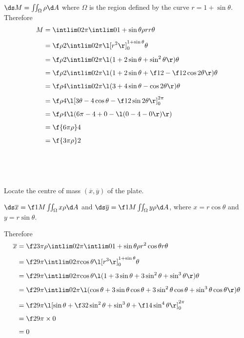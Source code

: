 \documentclass[a4paper]{article}
\begin{document}
$\ds M = \iint_\Omega \rho \d A$ where $\Omega$ is the region defined by the curve $r = 1 + \sin \theta$. Therefore \begin{align*}
M &= \intlim 0{2\pi} {\intlim 0 {1 + \sin \theta} {\rho r} r} \theta\\[1ex]
&= \f\rho2 \intlim 0{2\pi} {\l[ r^2 \r]_0^{1 + \sin \theta}} \theta\\[1ex]
&= \f\rho2 \intlim 0{2\pi} {\l( 1 + 2\sin\theta + \sin^2 \theta \r)} \theta\\[1ex]
&= \f\rho2 \intlim 0{2\pi} {\l( 1 + 2\sin\theta + \f12 - \f12 \cos 2\theta \r)} \theta\\[1ex]
&= \f\rho4 \intlim 0{2\pi} {\l( 3 + 4\sin\theta - \cos 2\theta \r)} \theta\\[1ex]
&= \f\rho4 \l[ 3\theta - 4\cos\theta - \f12 \sin 2\theta \r]_0^{2\pi}\\[1ex]
&= \f\rho4 \l( 6\pi - 4 + 0 - \l( 0 - 4 - 0 \r) \r)\\[1ex]
&= \f{6\pi \rho}4\\[1ex]
&= \f{3\pi \rho}2\\[1ex]
\end{align*}

\subsection{~} %

\begin{questionbody}
Locate the centre of mass $(\overline x, \overline y)$ of the plate.
\end{questionbody}

$\ds \overline x = \f1M \iint_\Omega x \rho \d A$ and $\ds \overline y = \f1M \iint_\Omega y \rho \d A$, where $x = r\cos\theta$ and $y = r\sin\theta$.

Therefore \begin{align*}
\overline x &= \f2{3\pi\rho} \intlim 0{2\pi} {\intlim 0 {1 + \sin \theta} {\rho r^2 \cos \theta} r} \theta \\[1ex]
&= \f2{9\pi} \intlim 0{2\pi} {\cos \theta \l[r^3\r]_0^{1 + \sin\theta}} \theta \\[1ex]
&= \f2{9\pi} \intlim 0{2\pi} {\cos \theta \l( 1 + 3\sin\theta + 3\sin^2 \theta + \sin^3 \theta \r)} \theta \\[1ex]
 &= \f2{9\pi} \intlim 0{2\pi} {\l( \cos\theta + 3\sin\theta \cos\theta + 3\sin^2 \theta \cos\theta + \sin^3 \theta \cos\theta \r)} \theta \\[1ex]
&= \f2{9\pi} \l[ \sin\theta + \f32 \sin^2 \theta + \sin^3 \theta + \f14 \sin^4 \theta\r]_0^{2\pi} \\[1ex]
&= \f2{9\pi} \times 0  \\[1ex]
&= 0
\end{align*}
\end{document}
